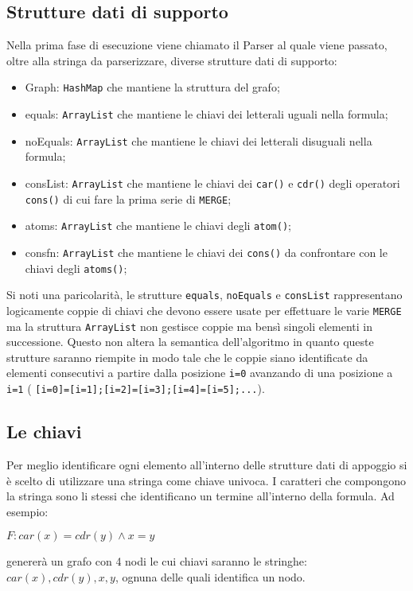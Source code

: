 \documentclass[a4paper,11pt]{article}
\begin{document}
\subsection{Strutture dati di supporto}
Nella prima fase di esecuzione viene chiamato il Parser al quale viene passato, oltre alla stringa da parserizzare, diverse strutture dati di supporto:
\begin{itemize}
	\item Graph: {\tt HashMap} che mantiene la struttura del grafo;
	\item equals: {\tt ArrayList} che mantiene le chiavi dei letterali uguali nella formula;
	\item noEquals: {\tt ArrayList} che mantiene le chiavi dei letterali disuguali nella formula;
	\item consList: {\tt ArrayList} che mantiene le chiavi dei {\tt car()} e {\tt cdr()} degli operatori {\tt cons()} di cui fare la prima serie di {\tt MERGE};
	\item atoms: {\tt ArrayList} che mantiene le chiavi degli {\tt atom()};
	\item consfn: {\tt ArrayList} che mantiene le chiavi dei {\tt cons()} da confrontare con le chiavi degli {\tt atoms()}; 
\end{itemize}
Si noti una paricolarità, le strutture {\tt equals}, {\tt noEquals} e {\tt consList} rappresentano logicamente coppie di chiavi che devono essere usate per effettuare le varie {\tt MERGE} ma la struttura {\tt ArrayList} non gestisce coppie ma bensì singoli elementi in successione.
Questo non altera la semantica dell'algoritmo in quanto queste strutture saranno riempite in modo tale che le coppie siano identificate da elementi consecutivi a partire dalla posizione {\tt i=0} avanzando di una posizione a {\tt i=1} ( {\tt [i=0]=[i=1];[i=2]=[i=3];[i=4]=[i=5];...}).
\subsection{Le chiavi}
Per meglio identificare ogni elemento all'interno delle strutture dati di appoggio si è scelto di utilizzare una stringa come chiave univoca.
I caratteri che compongono la stringa sono li stessi che identificano un termine all'interno della formula. Ad esempio:
\begin{center}
$F : car(x) = cdr(y) \wedge x = y $
\end{center}
genererà un grafo con 4 nodi le cui chiavi saranno le stringhe: $car(x),cdr(y),x,y$, ognuna delle quali identifica un nodo.
\end{document}
